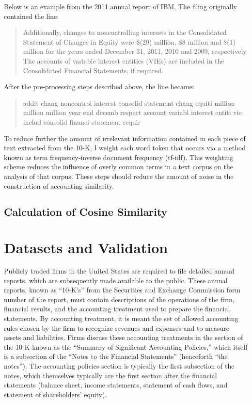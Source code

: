 \documentclass{article}
\begin{document}
Below is an example from the 2011 annual report of IBM. The filing originally contained the line:

\begin{quote}
Additionally, changes to noncontrolling interests in the Consolidated Statement of Changes in Equity were \$(29) million, \$8 million and \$(1) million for the years ended December 31, 2011, 2010 and 2009, respectively
The accounts of variable interest entities (VIEs) are included in the Consolidated Financial Statements, if required.
\end{quote}

After the pre-processing steps described above, the line became:

\begin{quote}
addit chang noncontrol interest consolid statement chang equiti million million million year end decemb respect account variabl interest entiti vie includ consolid financi statement requir
\end{quote}

To reduce further the amount of irrelevant information contained in each piece of text extracted from the 10-K, I weight each word token that occurs via a method known as term frequency-inverse document frequency (tf-idf). This weighting scheme reduces the influence of overly common terms in a text corpus on the analysis of that corpus. These steps should reduce the amount of noise in the construction of accounting similarity.

\subsection{Calculation of Cosine Similarity}

\section{Datasets and Validation}\label{data}
Publicly traded firms in the United States are required to file detailed annual reports, which are subsequently made available to the public. These annual reports, known as ``10-K's'' from the Securities and Exchange Commission form number of the report, must contain descriptions of the operations of the firm, financial results, and the accounting treatment used to prepare the financial statements. By accounting treatment, it is meant the set of allowed accounting rules chosen by the firm to recognize revenues and expenses and to measure assets and liabilities. Firms discuss these accounting treatments in the section of the 10-K known as the ``Summary of Significant Accounting Policies,''  which itself is a subsection of the ``Notes to the Financial Statements'' (henceforth ``the notes''). The accounting policies section is typically the first subsection of the notes, which themselves typically are the first section after the financial statements (balance sheet, income statements, statement of cash flows, and statement of shareholders' equity). 
\end{document}
